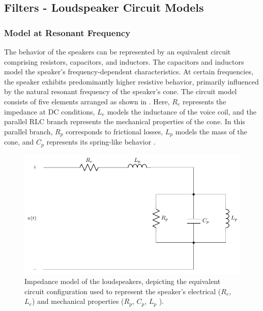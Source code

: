 \subsection{Filters - Loudspeaker Circuit Models}
\subsubsection{Model at Resonant Frequency}
The behavior of the speakers can be represented by an equivalent circuit comprising resistors, capacitors, and inductors. The capacitors and inductors model the speaker's frequency-dependent characteristics. At certain frequencies, the speaker exhibits predominantly higher resistive behavior, primarily influenced by the natural resonant frequency of the speaker's cone. The circuit model consists of five elements arranged as shown in . Here, $R_e$ represents the impedance at DC conditions, $L_e$ models the inductance of the voice coil, and the parallel RLC branch represents the mechanical properties of the cone. In this parallel branch, $R_p$ corresponds to frictional losses, $L_p$ models the mass of the cone, and $C_p$ represents its spring-like behavior \cite{johnshopkins_rlc}.
\begin{figure}[H]
    \centering
    \captionsetup{justification=raggedright, labelfont=bf}
    \includegraphics[width=0.6\linewidth]{figures/FilterGroup/ImpedanceModel1.pdf}
    \caption{Impedance model of the loudspeakers, depicting the equivalent circuit configuration used to represent the speaker's electrical ($R_e$, $L_e$) and mechanical properties ($R_p$, $C_p$, $L_p$ )\cite{IP-manual}.}
    \label{fig:impedance_model1}  
\end{figure}

